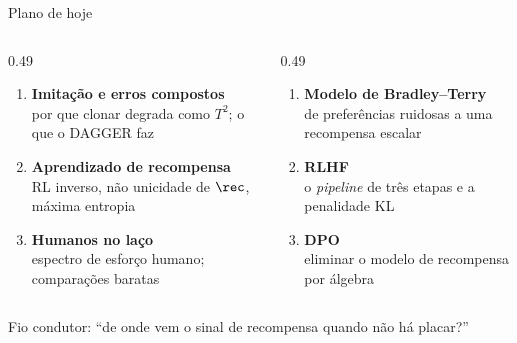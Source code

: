 \documentclass[aspectratio=169, 11pt]{beamer}
\begin{document}
\begin{frame}{Plano de hoje}

  \begin{columns}[T]
  \begin{column}{0.49\textwidth}
    \begin{enumerate}\setlength{\itemsep}{0.5ex}
      \item \textbf{Imitação e erros compostos}\\
        {\small por que clonar degrada como $T^2$; o que o DAGGER faz}
      \item \textbf{Aprendizado de recompensa}\\
        {\small RL inverso, não unicidade de $\rec$, máxima entropia}
      \item \textbf{Humanos no laço}\\
        {\small espectro de esforço humano; comparações baratas}
    \end{enumerate}
  \end{column}
  \begin{column}{0.49\textwidth}
    \begin{enumerate}\setlength{\itemsep}{0.5ex}
      \setcounter{enumi}{3}
      \item \textbf{Modelo de Bradley--Terry}\\
        {\small de preferências ruidosas a uma recompensa escalar}
      \item \textbf{RLHF}\\
        {\small o \emph{pipeline} de três etapas e a penalidade KL}
      \item \textbf{DPO}\\
        {\small eliminar o modelo de recompensa por álgebra}
    \end{enumerate}
  \end{column}
  \end{columns}

  \begin{ideiabox}
    Fio condutor: ``de onde vem o sinal de recompensa quando não há placar?''
  \end{ideiabox}
\end{frame}
\end{document}
